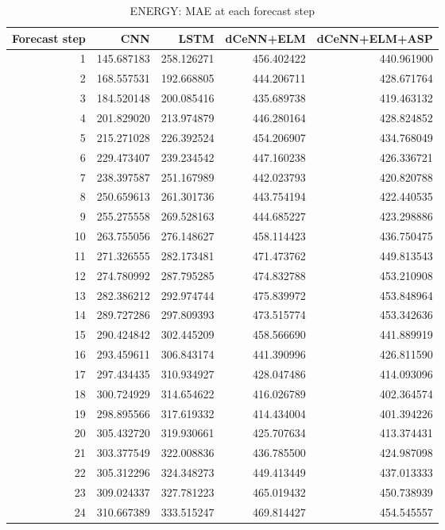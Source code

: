 \begin{table}
\caption{ENERGY: MAE at each forecast step}
\begin{tabular}{rrrrr}
\toprule
Forecast step & CNN & LSTM & dCeNN+ELM & dCeNN+ELM+ASP \\
\midrule
1 & 145.687183 & 258.126271 & 456.402422 & 440.961900 \\
2 & 168.557531 & 192.668805 & 444.206711 & 428.671764 \\
3 & 184.520148 & 200.085416 & 435.689738 & 419.463132 \\
4 & 201.829020 & 213.974879 & 446.280164 & 428.824852 \\
5 & 215.271028 & 226.392524 & 454.206907 & 434.768049 \\
6 & 229.473407 & 239.234542 & 447.160238 & 426.336721 \\
7 & 238.397587 & 251.167989 & 442.023793 & 420.820788 \\
8 & 250.659613 & 261.301736 & 443.754194 & 422.440535 \\
9 & 255.275558 & 269.528163 & 444.685227 & 423.298886 \\
10 & 263.755056 & 276.148627 & 458.114423 & 436.750475 \\
11 & 271.326555 & 282.173481 & 471.473762 & 449.813543 \\
12 & 274.780992 & 287.795285 & 474.832788 & 453.210908 \\
13 & 282.386212 & 292.974744 & 475.839972 & 453.848964 \\
14 & 289.727286 & 297.809393 & 473.515774 & 453.342636 \\
15 & 290.424842 & 302.445209 & 458.566690 & 441.889919 \\
16 & 293.459611 & 306.843174 & 441.390996 & 426.811590 \\
17 & 297.434435 & 310.934927 & 428.047486 & 414.093096 \\
18 & 300.724929 & 314.654622 & 416.026789 & 402.364574 \\
19 & 298.895566 & 317.619332 & 414.434004 & 401.394226 \\
20 & 305.432720 & 319.930661 & 425.707634 & 413.374431 \\
21 & 303.377549 & 322.008836 & 436.785500 & 424.987098 \\
22 & 305.312296 & 324.348273 & 449.413449 & 437.013333 \\
23 & 309.024337 & 327.781223 & 465.019432 & 450.738939 \\
24 & 310.667389 & 333.515247 & 469.814427 & 454.545557 \\
\bottomrule
\end{tabular}
\end{table}
